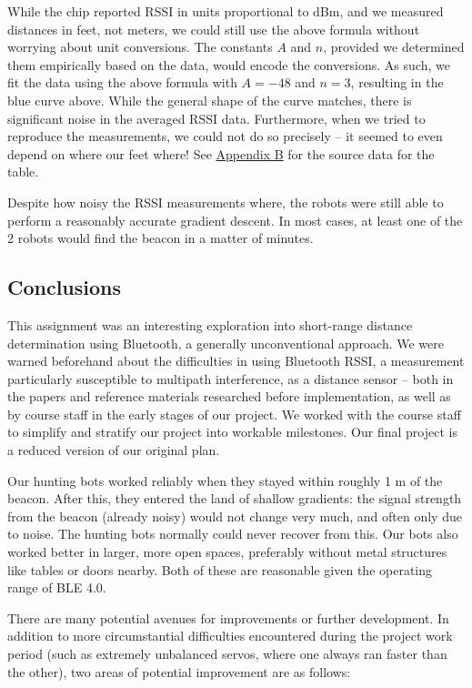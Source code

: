 \documentclass[]{article}
\begin{document}
While the chip reported RSSI in units proportional to dBm, and we
measured distances in feet, not meters, we could still use the above
formula without worrying about unit conversions. The constants \(A\) and
\(n\), provided we determined them empirically based on the data, would
encode the conversions. As such, we fit the data using the above formula
with \(A=-48\) and \(n=3\), resulting in the blue curve above. While the
general shape of the curve matches, there is significant noise in the
averaged RSSI data. Furthermore, when we tried to reproduce the
measurements, we could not do so precisely -- it seemed to even depend
on where our feet where! See \protect\hyperlink{rssi-data}{Appendix B}
for the source data for the table.

Despite how noisy the RSSI measurements where, the robots were still
able to perform a reasonably accurate gradient descent. In most cases,
at least one of the 2 robots would find the beacon in a matter of
minutes.

\hypertarget{conclusions}{%
\subsection{Conclusions}\label{conclusions}}

This assignment was an interesting exploration into short-range distance
determination using Bluetooth, a generally unconventional approach. We
were warned beforehand about the difficulties in using Bluetooth RSSI, a
measurement particularly susceptible to multipath interference, as a
distance sensor -- both in the papers and reference materials researched
before implementation, as well as by course staff in the early stages of
our project. We worked with the course staff to simplify and stratify
our project into workable milestones. Our final project is a reduced
version of our original plan.

Our hunting bots worked reliably when they stayed within roughly 1 m of
the beacon. After this, they entered the land of shallow gradients: the
signal strength from the beacon (already noisy) would not change very
much, and often only due to noise. The hunting bots normally could never
recover from this. Our bots also worked better in larger, more open
spaces, preferably without metal structures like tables or doors nearby.
Both of these are reasonable given the operating range of BLE 4.0.

There are many potential avenues for improvements or further
development. In addition to more circumstantial difficulties encountered
during the project work period (such as extremely unbalanced servos,
where one always ran faster than the other), two areas of potential
improvement are as follows:
\end{document}

